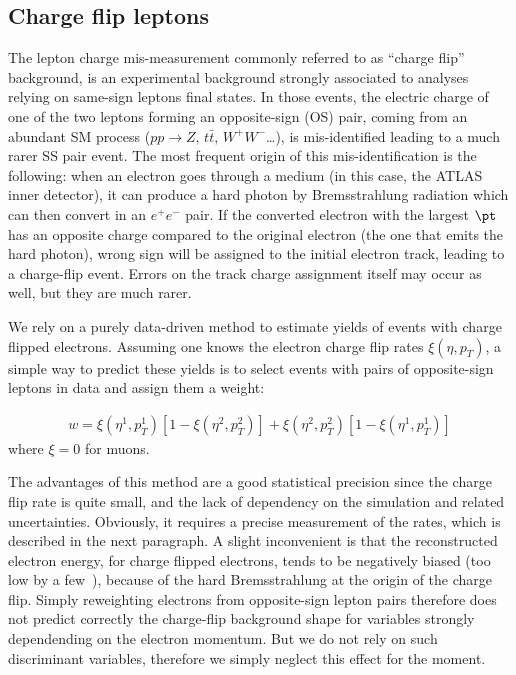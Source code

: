 
\subsection{Charge flip leptons}
\label{sec:bkg_chflips}

The lepton charge mis-measurement commonly referred to as ``charge flip'' background, 
is an experimental background strongly associated to analyses relying on same-sign leptons final states. 
In those events, the electric charge of one of the two leptons forming an opposite-sign (OS) pair, coming from an abundant SM process ($pp\to Z,\,t\bar{t},\,W^+W^-$\ldots), is mis-identified leading to a much rarer SS pair event. 
The most frequent origin of this mis-identification is the following: 
when an electron goes through a medium (in this case, the ATLAS inner detector), it can produce a hard photon by Bremsstrahlung radiation which can then convert in an $e^+e^-$ pair. If the converted electron with the largest $\pt$ has an opposite charge compared to the original electron (the one that emits the hard photon), wrong sign will be assigned to the initial electron track, leading to a charge-flip event. Errors on the track charge assignment itself may occur as well, but they are much rarer. 

We rely on a purely data-driven method to estimate yields of events with charge flipped electrons. 
Assuming one knows the electron charge flip rates $\xi(\eta,p_T)$, a simple way to predict these yields is to select 
events with pairs of opposite-sign leptons in data and assign them a weight: 

\begin{align}
w = \xi\left(\eta^{1},p_T^{1}\right)\left[1-\xi\left(\eta^{2},p_T^{2}\right)\right] 
+ \xi\left(\eta^{2},p_T^{2}\right)\left[1-\xi\left(\eta^{1},p_T^{1}\right)\right] 
\end{align}
where $\xi=0$ for muons. 

The advantages of this method are a good statistical precision since the charge flip rate is quite small, 
and the lack of dependency on the simulation and related uncertainties. 
Obviously, it requires a precise measurement of the rates, which is described in the next paragraph. 
A slight inconvenient is that the reconstructed electron energy, for charge flipped electrons, 
tends to be negatively biased (too low by a few~\GeV), because of the hard Bremsstrahlung at the origin of the charge flip. 
Simply reweighting electrons from opposite-sign lepton pairs therefore does not predict correctly the charge-flip background shape 
for variables strongly dependending on the electron momentum. 
But we do not rely on such discriminant variables, therefore we simply neglect this effect for the moment. 

